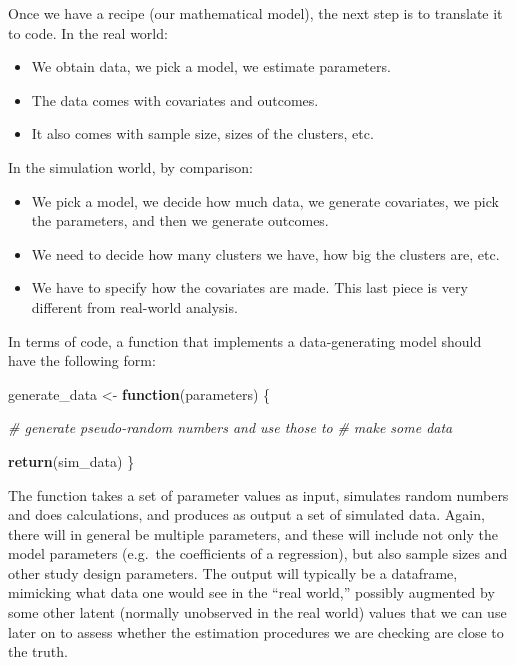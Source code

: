 \documentclass[
]{book}
\newenvironment{Shaded}{\begin{snugshade}}{\end{snugshade}}
\newcommand{\CommentTok}[1]{\textcolor[rgb]{0.56,0.35,0.01}{\textit{#1}}}
\newcommand{\ControlFlowTok}[1]{\textcolor[rgb]{0.13,0.29,0.53}{\textbf{#1}}}
\newcommand{\FunctionTok}[1]{\textcolor[rgb]{0.13,0.29,0.53}{\textbf{#1}}}
\newcommand{\NormalTok}[1]{#1}
\newcommand{\OtherTok}[1]{\textcolor[rgb]{0.56,0.35,0.01}{#1}}
\providecommand{\tightlist}{%
  \setlength{\itemsep}{0pt}\setlength{\parskip}{0pt}}
\begin{document}
Once we have a recipe (our mathematical model), the next step is to translate it to code.
In the real world:

\begin{itemize}
\tightlist
\item
  We obtain data, we pick a model, we estimate parameters.
\item
  The data comes with covariates and outcomes.
\item
  It also comes with sample size, sizes of the clusters, etc.
\end{itemize}

In the simulation world, by comparison:

\begin{itemize}
\tightlist
\item
  We pick a model, we decide how much data, we generate covariates, we pick the parameters, and then we generate outcomes.
\item
  We need to decide how many clusters we have, how big the clusters are, etc.
\item
  We have to specify how the covariates are made. This last piece is very different from real-world analysis.
\end{itemize}

In terms of code, a function that implements a data-generating model should have the following form:

\begin{Shaded}
\begin{Highlighting}[]
\NormalTok{generate\_data }\OtherTok{\textless{}{-}} \ControlFlowTok{function}\NormalTok{(parameters) \{}
  
  \CommentTok{\# generate pseudo{-}random numbers and use those to}
  \CommentTok{\# make some data}
  
  \FunctionTok{return}\NormalTok{(sim\_data)}
\NormalTok{\}}
\end{Highlighting}
\end{Shaded}

The function takes a set of parameter values as input, simulates random numbers and does calculations, and produces as output a set of simulated data.
Again, there will in general be multiple parameters, and these will include not only the model parameters (e.g.~the coefficients of a regression), but also sample sizes and other study design parameters.
The output will typically be a dataframe, mimicking what data one would see in the ``real world,'' possibly augmented by some other latent (normally unobserved in the real world) values that we can use later on to assess whether the estimation procedures we are checking are close to the truth.
\end{document}
